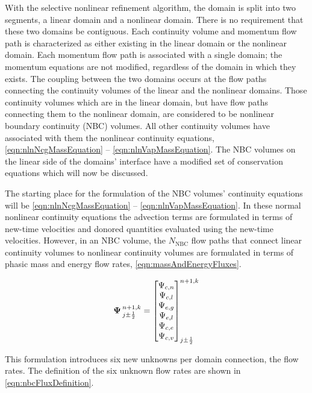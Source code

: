 With the selective nonlinear refinement algorithm, the domain is split into two segments, a linear domain and a nonlinear domain.
There is no requirement that these two domains be contiguous.
Each continuity volume and momentum flow path is characterized as either existing in the linear domain or the nonlinear domain.
Each momentum flow path is associated with a single domain; the momentum equations are not modified, regardless of the domain in which they exists.
The coupling between the two domains occurs at the flow paths connecting the continuity volumes of the linear and the nonlinear domains.
Those continuity volumes which are in the linear domain, but have flow paths connecting them to the nonlinear domain, are considered to be nonlinear boundary continuity (NBC) volumes.
All other continuity volumes have associated with them the nonlinear continuity equations, \eqref{eqn:nlnNcgMassEquation} -- \eqref{eqn:nlnVapMassEquation}.
The NBC volumes on the linear side of the domains' interface have a modified set of conservation equations which will now be discussed.

The starting place for the formulation of the NBC volumes' continuity equations will be \eqref{eqn:nlnNcgMassEquation} -- \eqref{eqn:nlnVapMassEquation}.
In these normal nonlinear continuity equations the advection terms are formulated in terms of new-time velocities and donored quantities evaluated using the new-time velocities.
However, in an NBC volume, the $N_{\text{NBC}}$ flow paths that connect linear continuity volumes to nonlinear continuity volumes are formulated in terms of phasic mass and energy flow rates, \eqref{eqn:massAndEnergyFluxes}.

\begin{equation}
\label{eqn:massAndEnergyFluxes}
\vec{\Psi}^{n+1, k}_{j \pm \onehalf} = \begin{bmatrix}
\Psi_{c, n} \\
\Psi_{c, l} \\
\Psi_{e, g} \\
\Psi_{e, l} \\
\Psi_{c, e} \\
\Psi_{c, v} \\
\end{bmatrix}^{n+1, k}_{j \pm \onehalf}
\end{equation}

This formulation introduces six new unknowns per domain connection, the flow rates.
The definition of the six unknown flow rates are shown in \eqref{eqn:nbcFluxDefinition}.

